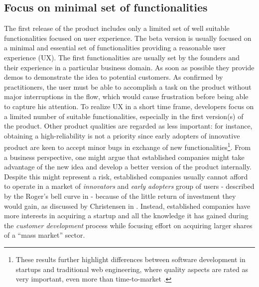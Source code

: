 \documentclass[10pt,journal,letterpaper,compsoc]{IEEEtran}
\begin{document}
\subsection{Focus on minimal set of functionalities} 
The first release of the product includes only a limited set of well  suitable 
functionalities focused on user experience. The beta version is usually  
focused on a minimal and essential set of functionalities providing a reasonable 
user experience (UX). The first functionalities are usually set by the 
founders and their experience in a particular business domain. As soon as 
possible they provide demos to demonstrate the idea to potential customers. 
As confirmed by practitioners, the user must be able to  accomplish a task on 
the product without major interruptions in the flow, which  would cause 
frustration before being able to capture his attention. To realize  UX in a 
short time frame, developers focus on a limited number of suitable  
functionalities, especially in the first version(s) of the product. Other  
product qualities are regarded as less important: for instance, obtaining a  
high-reliability is not a priority since early adopters of innovative product  
are keen to accept minor bugs in exchange of new functionalities\footnote{These 
results further highlight differences between software development in startups 
and traditional web engineering, where quality aspects are rated as very  
important, even more than time-to-market \cite{Offutt2002}.}. From a business  
perspective, one might argue that established companies might take advantage of 
the new idea and develop a better version of the product internally. Despite 
this might represent a risk, established companies usually cannot  afford to 
operate in a market of \textit{innovators} and \textit{early adopters}  group 
of users - described by the Roger's bell curve in \cite{Rogers} - because  of 
the little return of investment they would gain, as discussed by Christensen  in
\cite{Christensen2003}. Instead, established companies have more interests  in
acquiring a startup and all the knowledge it has gained during the
\textit{customer development} process while focusing effort on acquiring larger
shares of a ``mass market'' sector.  
\end{document}
